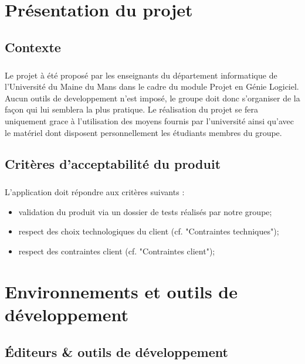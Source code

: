 \chapter{Présentation du projet}
\section{Contexte}
        \paragraph*{}
	Le projet à été proposé par les enseignants du département informatique de l'Université du Maine du Mans 
	dans le cadre du module Projet en Génie Logiciel.
	Aucun outils de developpement n'est imposé, le groupe doit donc s'organiser de la façon qui lui semblera la plus pratique. 
	Le réalisation du projet se fera uniquement grace à l'utilisation des moyens fournis par l'université ainsi qu'avec le matériel dont 
	disposent personnellement les étudiants membres du groupe. 


\section{Critères d'acceptabilité du produit}
        \paragraph*{}
	L’application doit répondre aux critères suivants :
	\begin{itemize}
  	  	\item validation du produit via un dossier de tests réalisés par notre groupe;
  	  	\item respect des choix technologiques du client (cf. "Contraintes techniques");
  	  	\item respect des contraintes client (cf. "Contraintes client");
	\end{itemize}



\chapter{Environnements et outils de développement} 


\section{Éditeurs \& outils de développement}
